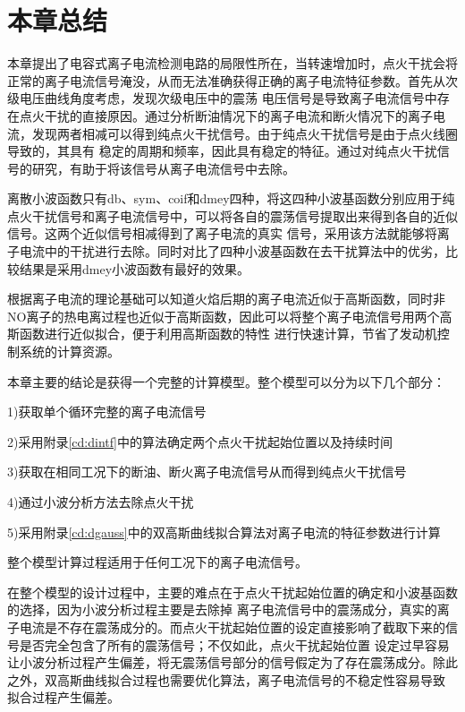 \section{本章总结}
本章提出了电容式离子电流检测电路的局限性所在，当转速增加时，点火干扰会将正常的离子电流信号淹没，从而无法准确获得正确的离子电流特征参数。首先从次级电压曲线角度考虑，发现次级电压中的震荡
电压信号是导致离子电流信号中存在点火干扰的直接原因。通过分析断油情况下的离子电流和断火情况下的离子电流，发现两者相减可以得到纯点火干扰信号。由于纯点火干扰信号是由于点火线圈导致的，其具有
稳定的周期和频率，因此具有稳定的特征。通过对纯点火干扰信号的研究，有助于将该信号从离子电流信号中去除。\par
离散小波函数只有db、sym、coif和dmey四种，将这四种小波基函数分别应用于纯点火干扰信号和离子电流信号中，可以将各自的震荡信号提取出来得到各自的近似信号。这两个近似信号相减得到了离子电流的真实
信号，采用该方法就能够将离子电流中的干扰进行去除。同时对比了四种小波基函数在去干扰算法中的优劣，比较结果是采用dmey小波函数有最好的效果。\par
根据离子电流的理论基础可以知道火焰后期的离子电流近似于高斯函数，同时非NO离子的热电离过程也近似于高斯函数，因此可以将整个离子电流信号用两个高斯函数进行近似拟合，便于利用高斯函数的特性
进行快速计算，节省了发动机控制系统的计算资源。\par
本章主要的结论是获得一个完整的计算模型。整个模型可以分为以下几个部分：\par
1)获取单个循环完整的离子电流信号\par
2)采用附录\ref{cd:dintf}中的算法确定两个点火干扰起始位置以及持续时间\par
3)获取在相同工况下的断油、断火离子电流信号从而得到纯点火干扰信号\par
4)通过小波分析方法去除点火干扰\par
5)采用附录\ref{cd:dgauss}中的双高斯曲线拟合算法对离子电流的特征参数进行计算\par
整个模型计算过程适用于任何工况下的离子电流信号。\par
在整个模型的设计过程中，主要的难点在于点火干扰起始位置的确定和小波基函数的选择，因为小波分析过程主要是去除掉
离子电流信号中的震荡成分，真实的离子电流是不存在震荡成分的。而点火干扰起始位置的设定直接影响了截取下来的信号是否完全包含了所有的震荡信号；不仅如此，点火干扰起始位置
设定过早容易让小波分析过程产生偏差，将无震荡信号部分的信号假定为了存在震荡成分。除此之外，双高斯曲线拟合过程也需要优化算法，离子电流信号的不稳定性容易导致
拟合过程产生偏差。\par